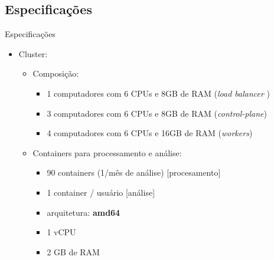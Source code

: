\documentclass[10pt,brazil]{beamer}
\theoremstyle{definition}
\begin{document}
\subsection{Especificações}

\begin{frame}[allowframebreaks]{Especificações}
      \begin{itemize}
        \item Cluster:
              \begin{itemize}
                \item Composição:
                \begin{itemize}
                    \item 1 computadores com 6 CPUs e 8GB de RAM (\emph{load balancer })
                    \item 3 computadores com 6 CPUs e 8GB de RAM (\emph{control-plane})
                    \item 4 computadores com 6 CPUs e 16GB de RAM (\emph{workers})
                \end{itemize}
              \end{itemize}
        \begin{itemize}
            \item Containers para processamento e análise:
              \begin{itemize}
                \item 90 containers (1/mês de análise) [procesamento]
                \item 1 container /  usuário [análise]
                \item arquitetura: \textbf{amd64}
                \item 1 vCPU
                \item 2 GB de RAM
              \end{itemize}
        \end{itemize}
    \end{itemize}
    
  \framebreak
  

\end{frame}
\end{document}
